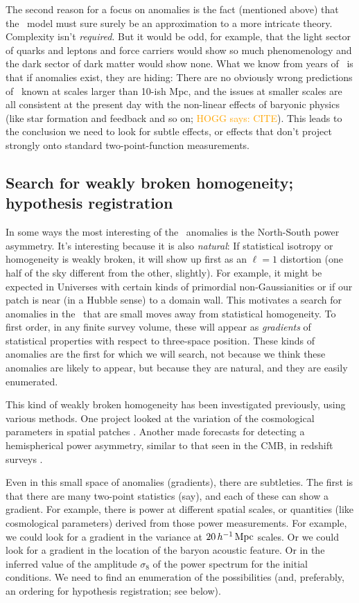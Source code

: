 \documentclass[12pt, fullpage, letterpaper]{article}
\newcommand{\HOGG}[1]{\textcolor{orange}{HOGG says: #1}}
\begin{document}
The second reason for a focus on anomalies is the fact (mentioned
above) that the \LCDM\ model must sure surely be an approximation to a
more intricate theory.
Complexity isn't \emph{required}.
But it would be odd, for example, that the light sector of quarks and leptons and
force carriers would show so much phenomenology and the dark sector of
dark matter would show none.
What we know from years of \LCDM\ is that if anomalies exist, they are
hiding: There are no obviously wrong predictions of \LCDM\ known at
scales larger than 10-ish Mpc, and the issues at smaller scales are
all consistent at the present day with the non-linear effects of baryonic
physics (like star formation and feedback and so on; \HOGG{CITE}).
This leads to the conclusion we need to look for subtle effects, or effects that
don't project strongly onto standard two-point-function measurements.

\subsection{Search for weakly broken homogeneity; hypothesis registration}

In some ways the most interesting of the \CMB\ anomalies is the
North-South power asymmetry. It's interesting because it is also
\emph{natural}: If statistical isotropy or homogeneity is weakly
broken, it will show up first as an $\ell=1$ distortion (one half of
the sky different from the other, slightly).
For example, it might be expected in Universes with certain kinds
of primordial non-Gaussianities \citep{Dalal2008} or if our patch is
near (in a Hubble sense) to a domain wall.
This motivates a search for anomalies in the \LSS\ that are small
moves away from statistical homogeneity.
To first order, in any finite survey volume, these will appear as
\emph{gradients} of statistical properties with respect to three-space
position.
These kinds of anomalies are the first for which we will search, not
because we think these anomalies are likely to appear, but because they
are natural, and they are easily enumerated.

This kind of weakly broken homogeneity has been investigated previously,
using various methods.
One project looked at the variation of the cosmological parameters in spatial patches \citep{Mukherjee2018}.
Another made forecasts for detecting a hemispherical power asymmetry, similar to that seen in the CMB, in redshift surveys \citep{Zhai2017}.

Even in this small space of anomalies (gradients), there are subtleties. The first
is that there are many two-point statistics (say), and each of these can
show a gradient. For example, there is power at different spatial scales,
or quantities (like cosmological parameters) derived from those power
measurements. For example, we could look for a gradient in the variance at
$20\,h^{-1}\,{\mathrm{Mpc}}$ scales. Or we could look for a gradient in the location
of the baryon acoustic feature. Or in the inferred value of the amplitude
$\sigma_8$ of the power spectrum for the initial conditions.
We need to find an enumeration of the possibilities (and, preferably, an
ordering for hypothesis registration; see below).
\end{document}

